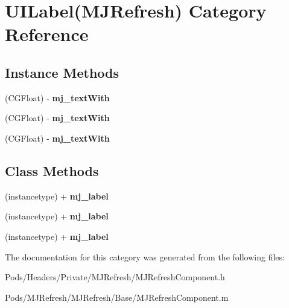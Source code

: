\hypertarget{category_u_i_label_07_m_j_refresh_08}{}\section{U\+I\+Label(M\+J\+Refresh) Category Reference}
\label{category_u_i_label_07_m_j_refresh_08}
\subsection*{Instance Methods}
\begin{DoxyCompactItemize}
\item 
\mbox{\label{category_u_i_label_07_m_j_refresh_08_aa60d9aaf3b9563f7cd6c03640f392efc}} 
(C\+G\+Float) -\/ {\bfseries mj\+\_\+text\+With}
\item 
\mbox{\label{category_u_i_label_07_m_j_refresh_08_aa60d9aaf3b9563f7cd6c03640f392efc}} 
(C\+G\+Float) -\/ {\bfseries mj\+\_\+text\+With}
\item 
\mbox{\label{category_u_i_label_07_m_j_refresh_08_aa60d9aaf3b9563f7cd6c03640f392efc}} 
(C\+G\+Float) -\/ {\bfseries mj\+\_\+text\+With}
\end{DoxyCompactItemize}
\subsection*{Class Methods}
\begin{DoxyCompactItemize}
\item 
\mbox{\label{category_u_i_label_07_m_j_refresh_08_af79e0769798cbd49a2d94405f0b66c9c}} 
(instancetype) + {\bfseries mj\+\_\+label}
\item 
\mbox{\label{category_u_i_label_07_m_j_refresh_08_af79e0769798cbd49a2d94405f0b66c9c}} 
(instancetype) + {\bfseries mj\+\_\+label}
\item 
\mbox{\label{category_u_i_label_07_m_j_refresh_08_af79e0769798cbd49a2d94405f0b66c9c}} 
(instancetype) + {\bfseries mj\+\_\+label}
\end{DoxyCompactItemize}


The documentation for this category was generated from the following files\+:\begin{DoxyCompactItemize}
\item 
Pods/\+Headers/\+Private/\+M\+J\+Refresh/M\+J\+Refresh\+Component.\+h\item 
Pods/\+M\+J\+Refresh/\+M\+J\+Refresh/\+Base/M\+J\+Refresh\+Component.\+m\end{DoxyCompactItemize}
